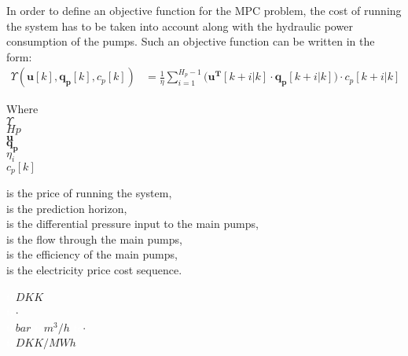 In order to define an objective function for the MPC problem, the cost of running the system has to be taken into account along with the hydraulic power consumption of the pumps. Such an objective function can be written in the form: 
%
\begin{align}
 \Upsilon(\bm{u}[k],\bm{q_p}[k],c_p[k]) &= \frac{1}{\eta} \sum_{i=1}^{H_p-1} \Big( \bm{u^T}[k+i|k] \cdot  \bm{q_{p}}[k+i|k]\Big)\cdot c_p[k+i|k] \label{eqcost} 
\end{align}
%
%
\begin{minipage}[t]{0.20\textwidth}
Where\\
\hspace*{8mm} $\Upsilon$ \\
\hspace*{8mm} $Hp$ \\
\hspace*{8mm} $\bm{u}$ \\
\hspace*{8mm} $\bm{q_p}$ \\
\hspace*{8mm} $\eta_i$ \\
\hspace*{8mm} $c_p[k]$ 
\end{minipage}
\begin{minipage}[t]{0.68\textwidth}
\vspace*{2mm}
is the price of running the system, \\
is the prediction horizon, \\
is the differential pressure input to the main pumps,\\
is the flow through the main pumps,\\
is the efficiency of the main pumps,\\
is the electricity price cost sequence.
\end{minipage}
\begin{minipage}[t]{0.10\textwidth}
\vspace*{2mm}
\textcolor{White}{te}$\unit{DKK}$\\
\textcolor{White}{te}$\unit{\cdot}$\\
\textcolor{White}{te}$\unit{bar}$
\textcolor{White}{te}$\unit{m^3/h}$
 \textcolor{White}{te}$\unit{\cdot}$\\
\textcolor{White}{te}$\unit{DKK/MWh}$
\end{minipage}

